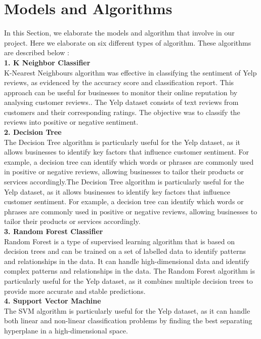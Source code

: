 \documentclass[a4paper, 12pt]{report}
\begin{document}
\section{Models and Algorithms}
In this Section, we elaborate the models and algorithm that involve in our project. Here we elaborate on six different types of algorithm. These algorithms are described below : \\ 
\textbf{1. K Neighbor Classifier}\\
K-Nearest Neighbours algorithm was effective in classifying the sentiment of Yelp reviews, as evidenced by the accuracy score and classification report. This approach can be useful for businesses to monitor their online reputation by analysing customer reviews.. The Yelp dataset consists of text reviews from customers and their corresponding ratings. The objective was to classify the reviews into positive or negative sentiment.\\
\textbf{2. Decision Tree}\\
The Decision Tree algorithm is particularly useful for the Yelp dataset, as it allows businesses to identify key factors that influence customer sentiment. For example, a decision tree can identify which words or phrases are commonly used in positive or negative reviews, allowing businesses to tailor their products or services accordingly.The Decision Tree algorithm is particularly useful for the Yelp dataset, as it allows businesses to identify key factors that influence customer sentiment. For example, a decision tree can identify which words or phrases are commonly used in positive or negative reviews, allowing businesses to tailor their products or services accordingly.\\
\textbf{3. Random Forest Classifier}\\
Random Forest is a type of supervised learning algorithm that is based on decision trees and can be trained on a set of labelled data to identify patterns and relationships in the data. It can handle high-dimensional data and identify complex patterns and relationships in the data. The Random Forest algorithm is particularly useful for the Yelp dataset, as it combines multiple decision trees to provide more accurate and stable predictions.\\
\textbf{4. Support Vector Machine}\\
The SVM algorithm is particularly useful for the Yelp dataset, as it can handle both linear and non-linear classification problems by finding the best separating hyperplane in a high-dimensional space.
\end{document}
